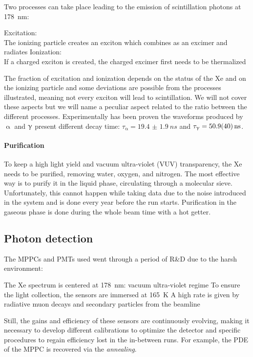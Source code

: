 \begin{refsection}
        \noindent
        Two processes can take place leading to the emission of scintillation photons at \SI{178}{nm}:
        \begin{outline}
            \1 Excitation: \\
            The ionizing particle creates an exciton which combines as an excimer and radiates
            \1 Ionization: \\
            If a charged exciton is created, the charged excimer first needs to be thermalized
        \end{outline}
        The fraction of excitation and ionization depends on the status of the Xe and on the ionizing particle and some deviations are possible from the processes illustrated, meaning not every exciton will lead to scintillation.
        We will not cover these aspects but we will name a peculiar aspect related to the ratio between the different processes.
        Experimentally has been proven the waveforms produced by $\upalpha$ and $\g$ present different decay time: $\tau_\upalpha = \SI{19.4(19)}{ns}$ and $\tau_\g = \SI{50.9(40)}{ns}$.
        
        \paragraph{Purification} To keep a high light yield and vacuum ultra-violet (VUV) transparency, the Xe needs to be purified, removing water, oxygen, and nitrogen. 
        The most effective way is to purify it in the liquid phase, circulating through a molecular sieve.
        Unfortunately, this cannot happen while taking data due to the noise introduced in the system and is done every year before the run starts.
        Purification in the gaseous phase is done during the whole beam time with a hot getter.

    \subsection{Photon detection}
        The MPPCs and PMTs used went through a period of R\&D due to the harsh environment:
        \begin{outline}
            \1 The Xe spectrum is centered at \SI{178}{nm}: vacuum ultra-violet regime
            \1 To ensure the light collection, the sensors are immersed at \SI{165}{\kelvin}
            \1 A high rate is given by radiative muon decays and secondary particles  from the beamline
        \end{outline}
        \noindent
        Still, the gains and efficiency of these sensors are continuously evolving, making it necessary to develop different calibrations to optimize the detector and specific procedures to regain efficiency lost in the in-between runs.
        For example, the PDE of the MPPC is recovered via the \textit{annealing}.


\end{refsection}
